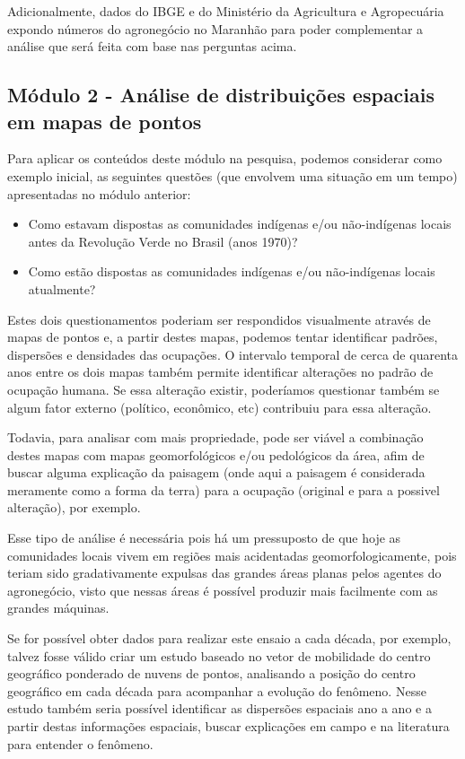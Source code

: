 Adicionalmente, dados do IBGE e do Ministério da Agricultura e Agropecuária expondo números do agronegócio no Maranhão para poder complementar a análise que será feita com base nas perguntas acima.

\subsection{Módulo 2 - Análise de distribuições espaciais em mapas de pontos}

Para aplicar os conteúdos deste módulo na pesquisa, podemos considerar como exemplo inicial, as seguintes questões (que envolvem uma situação em um tempo) apresentadas no módulo anterior:

\begin{itemize}
  \item Como estavam dispostas as comunidades indígenas e/ou não-indígenas locais antes da Revolução Verde no Brasil (anos 1970)?
  \item Como estão dispostas as comunidades indígenas e/ou não-indígenas locais atualmente?
\end{itemize}

Estes dois questionamentos poderiam ser respondidos visualmente através de mapas de pontos e, a partir destes mapas, podemos tentar identificar padrões, dispersões e densidades das ocupações. O intervalo temporal de cerca de quarenta anos entre os dois mapas também permite identificar alterações no padrão de ocupação humana. Se essa alteração existir, poderíamos questionar também se algum fator externo (político, econômico, etc) contribuiu para essa alteração.

Todavia, para analisar com mais propriedade, pode ser viável a combinação destes mapas com mapas geomorfológicos e/ou pedológicos da área, afim de buscar alguma explicação da paisagem (onde aqui a paisagem é considerada meramente como a forma da terra) para a ocupação (original e para a possivel alteração), por exemplo.

Esse tipo de análise é necessária pois há um pressuposto de que hoje as comunidades locais vivem em regiões mais acidentadas geomorfologicamente, pois teriam sido gradativamente expulsas das grandes áreas planas pelos agentes do agronegócio, visto que nessas áreas é possível produzir mais facilmente com as grandes máquinas. 

Se for possível obter dados para realizar este ensaio a cada década, por exemplo, talvez fosse válido criar um estudo baseado no vetor de mobilidade do centro geográfico ponderado de nuvens de pontos, analisando a posição do centro geográfico em cada década para acompanhar a evolução do fenômeno. Nesse estudo também seria possível identificar as dispersões espaciais ano a ano e a partir destas informações espaciais, buscar explicações em campo e na literatura para entender o fenômeno.

